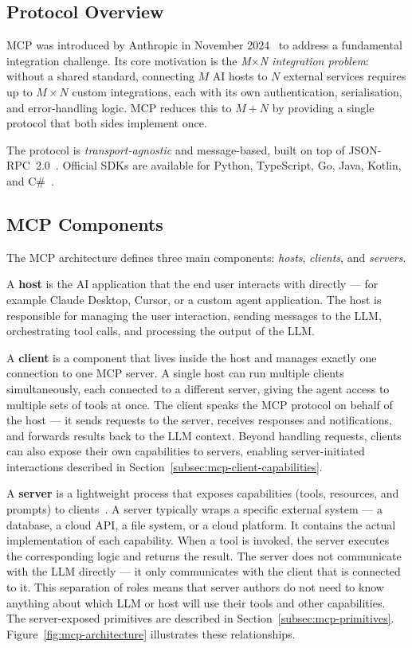 \documentclass[
  digital,     %
  oneside,     %
  nosansbold,  %
  nocolorbold, %
  lof,         %
  lot,         %
]{fithesis4}
\begin{document}
\subsection{Protocol Overview}
\label{subsec:mcp-overview}

MCP was introduced by Anthropic in November
2024~\parencite{mcp-announcement} to address a fundamental integration
challenge. Its core motivation is the \textit{M$\times$N integration
problem}: without a shared standard, connecting $M$ AI hosts to $N$
external services requires up to $M \times N$ custom integrations, each
with its own authentication, serialisation, and error-handling logic. MCP
reduces this to $M + N$ by providing a single protocol that both sides
implement once.

The protocol is \textit{transport-agnostic} and message-based, built on top
of JSON-RPC~2.0~\parencite{jsonrpc-spec}. Official SDKs are available for
Python, TypeScript, Go, Java, Kotlin, and
C\#~\parencite{mcp-github}.

\subsection{MCP Components}
\label{subsec:mcp-clients-servers}

The MCP architecture defines three main components: \textit{hosts},
\textit{clients}, and \textit{servers}.

A \textbf{host} is the AI application that the end user interacts with
directly --- for example Claude Desktop, Cursor, or a custom agent
application. The host is responsible for managing the user interaction,
sending messages to the LLM, orchestrating tool calls, and processing the output of the LLM.

A \textbf{client} is a component that lives inside the host and manages
exactly one connection to one MCP server. A single host can run multiple
clients simultaneously, each connected to a different server, giving the
agent access to multiple sets of tools at once. The client speaks the MCP
protocol on behalf of the host --- it sends requests to the server, receives
responses and notifications, and forwards results back to the LLM context.
Beyond handling requests, clients can also expose their own capabilities
to servers, enabling server-initiated interactions described in
Section~\ref{subsec:mcp-client-capabilities}.

A \textbf{server} is a lightweight process that exposes capabilities (tools, resources, and prompts) to
clients~\parencite{mcp-spec}. A server typically wraps a specific external system --- a database,
a cloud API, a file system, or a cloud platform. It contains the actual implementation of each capability.
When a tool is invoked, the server executes the corresponding logic and
returns the result. The server does not communicate with the LLM directly --- it only
communicates with the client that is connected to it. This separation of
roles means that server authors do not need to know anything about which
LLM or host will use their tools and other capabilities.
The server-exposed primitives are described in
Section~\ref{subsec:mcp-primitives}. Figure~\ref{fig:mcp-architecture}
illustrates these relationships.
\end{document}
